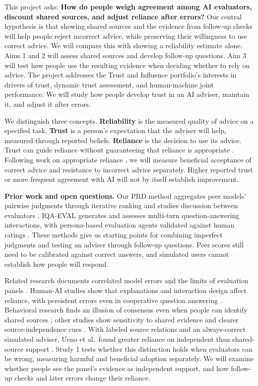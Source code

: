 \documentclass[12pt]{article}
\begin{document}
This project asks: \textbf{How do people weigh agreement among AI evaluators, discount shared sources, and adjust reliance after errors?} Our central hypothesis is that showing shared sources and the evidence from follow-up checks will help people reject incorrect advice, while preserving their willingness to use correct advice. We will compare this with showing a reliability estimate alone. Aims 1 and 2 will assess shared sources and develop follow-up questions. Aim 3 will test how people use the resulting evidence when deciding whether to rely on advice. The project addresses the Trust and Influence portfolio's interests in drivers of trust, dynamic trust assessment, and human-machine joint performance. We will study how people develop trust in an AI adviser, maintain it, and adjust it after errors.

We distinguish three concepts. \textbf{Reliability} is the measured quality of advice on a specified task. \textbf{Trust} is a person's expectation that the adviser will help, measured through reported beliefs. \textbf{Reliance} is the decision to use its advice. Trust can guide reliance without guaranteeing that reliance is appropriate \citep{lee2004trust}. Following work on appropriate reliance \citep{schemmer2023appropriate}, we will measure beneficial acceptance of correct advice and resistance to incorrect advice separately. Higher reported trust or more frequent agreement with AI will not by itself establish improvement.

\textbf{Prior work and open questions.} Our PRD method aggregates peer models' pairwise judgments through iterative ranking and studies discussion between evaluators \citep{li2024prd}. IQA-EVAL generates and assesses multi-turn question-answering interactions, with persona-based evaluation agents validated against human ratings \citep{li2024iqa}. These methods give us starting points for combining imperfect judgments and testing an adviser through follow-up questions. Peer scores still need to be calibrated against correct answers, and simulated users cannot establish how people will respond.

Related research documents correlated model errors and the limits of evaluation panels \citep{kim2025correlated,kohli2026nine}. Human-AI studies show that explanations and interaction design affect reliance, with persistent errors even in cooperative question answering \citep{bucinca2021trust,gor2026wheel}. Behavioral research finds an illusion of consensus even when people can identify shared sources \citep{yousif2019illusion}; other studies show sensitivity to shared evidence and clearer source-independence cues \citep{whalen2018shared,connordesai2022source}. With labeled source relations and an always-correct simulated adviser, Ueno et al.\ found greater reliance on independent than shared-source support \citep{ueno2023consensus}. Study 1 tests whether this distinction holds when evaluators can be wrong, measuring harmful and beneficial adoption separately. We will examine whether people see the panel's evidence as independent support, and how follow-up checks and later errors change their reliance.
\end{document}
